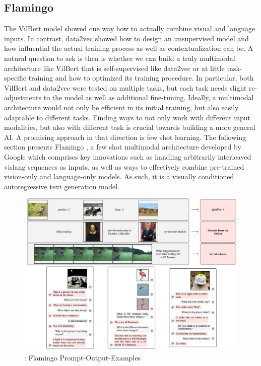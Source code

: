 \documentclass[
]{krantz}
\begin{document}
\hypertarget{flamingo}{%
\subsection{Flamingo}\label{flamingo}}

The VilBert model showed one way how to actually combine visual and language inputs. In contrast, data2vec showed how to design an unsupervised model and how influential the actual training process as well as contextualization can be. A natural question to ask is then is whether we can build a truly multimodal architecture like VilBert that is self-supervised like data2vec or at little task-specific training and how to optimized its training procedure. In particular, both VilBert and data2vec were tested on multiple tasks, but each task needs slight re-adjustments to the model as well as additional fine-tuning. Ideally, a multimodal architecture would not only be efficient in its initial training, but also easily adaptable to different tasks. Finding ways to not only work with different input modalities, but also with different task is crucial towards building a more general AI. A promising approach in that direction is few shot learning. The following section presents Flamingo \citep{alayrac2022flamingo}, a few shot multimodal architecture developed by Google which comprises key innovations such as handling arbitrarily interleaved vislang sequences as inputs, as well as ways to effectively combine pre-trained vision-only and language-only models. As such, it is a visually conditioned autoregressive text generation model.

\begin{figure}

{\centering \includegraphics[width=1\linewidth]{figures/05-chapter2/flamingoexamples} 

}

\caption{\citet{alayrac2022flamingo}: Flamingo Prompt-Output-Examples}\label{fig:flamingoexamples}
\end{figure}
\end{document}
